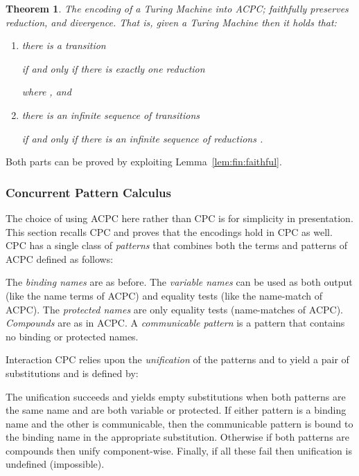\documentclass[submission,copyright,creativecommons]{eptcs}
\newtheorem{theorem}{Theorem}[section]
\newenvironment{proof}[1][Proof]{\begin{trivlist}
\item[\hskip \labelsep {\bfseries #1}]}{\end{trivlist}}
\begin{document}
\begin{theorem}
\label{thm:fin:done}
The encoding  of a Turing Machine into ACPC; faithfully preserves reduction, and
divergence.
That is, given a Turing Machine 
then it holds that:
\begin{enumerate}
\item there is a transition

if and only if there is exactly one reduction

where , and
\item there is an infinite sequence of transitions

if and only if there is an infinite sequence of reductions
.
\end{enumerate}
\end{theorem}
\begin{proof}
Both parts can be proved by exploiting Lemma~\ref{lem:fin:faithful}.
\end{proof}


\subsubsection*{Concurrent Pattern Calculus}
\label{ssec:cpc}


The choice of using ACPC here rather than CPC is for simplicity in presentation.
This section recalls CPC and proves that the encodings hold in CPC as well.
CPC has a single class of {\em patterns} that combines both the terms and patterns of
ACPC defined as follows:

The {\em binding names}  are as before.
The {\em variable names}  can be used as both output (like the name terms
of ACPC) and equality tests (like the name-match of ACPC).
The {\em protected names}  are only equality tests (name-matches of ACPC).
{\em Compounds}  are as in ACPC.
A {\em communicable pattern} is a pattern that contains no binding or protected names.
\newcommand{\cpcmatch}[2]{\{ #1\pmatch #2\}}

Interaction CPC relies upon the {\em unification}  of the patterns  and 
to yield a pair of substitutions  and is 
defined by:

The unification succeeds and yields empty substitutions when both patterns are the same
name and are both variable or protected.
If either pattern is a binding name and the other is communicable, then the communicable
pattern is bound to the binding name in the appropriate substitution.
Otherwise if both patterns are compounds then unify component-wise.
Finally, if all these fail then unification is undefined (impossible).
\end{document}
